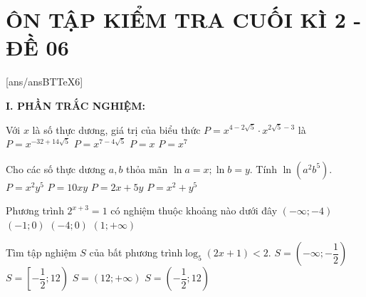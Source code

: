 \section*{ÔN TẬP KIỂM TRA CUỐI KÌ 2 - ĐỀ 06}
\setcounter{ex}{0}\setcounter{bt}{0}
[ans/ansBTTeX6]

\noindent\textbf{I. PHẦN TRẮC NGHIỆM:}
\begin{ex}
Với $x$ là số thực dương, giá trị của biểu thức $P={x^{4-2\sqrt{5}}} \cdot {x^{2\sqrt{5}-3}}$ là
\choice
{$P={x^{-32+14\sqrt{5}}}$}
{$P={x^{7-4\sqrt{5}}}$}
{\True $P=x$}
{$P=x^7$}
\end{ex}
\begin{ex}
Cho các số thực dương $a,b$ thỏa mãn $\ln a=x;\ln b=y$. Tính $\ln \left(a^2b^5\right)$.
\choice
{$P=x^2y^5$}
{$P=10xy$}
{\True $P=2x+5y$}
{$P=x^2+y^5$}
\end{ex}
\begin{ex}
\end{ex}
\begin{ex}
Phương trình ${2^{x+3}}=1$ có nghiệm thuộc khoảng nào dưới đây
\choice
{$\left(-\infty ;-4\right)$}
{$(-1;0)$}
{\True $(-4;0)$}
{$\left(1;+\infty\right)$}
\end{ex}
\begin{ex}
Tìm tập nghiệm $S$ của bất phương trình$\log _5(2x+1)<2$.
\choice
{$S=\left(-\infty ;-\dfrac{1}{2}\right)$}
{$S=\left[-\dfrac{1}{2};12\right)$}
{$S=\left(12;+\infty\right)$}
{\True $S=\left(-\dfrac{1}{2};12\right)$}
\end{ex}
